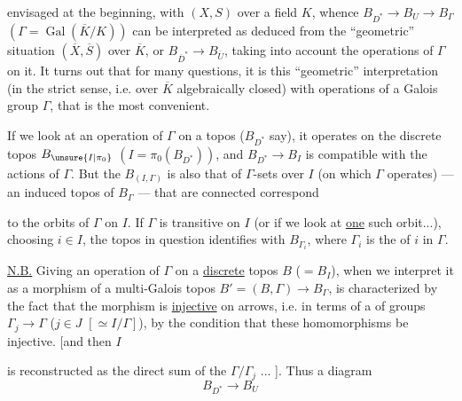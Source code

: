 
 envisaged at the beginning, with $(X,S)$ over a field $K$,
whence  $B_{D^*}\longrightarrow B_U\longrightarrow B_\Gamma$
$(\Gamma=\operatorname{Gal}(\overline K/K))$
can be interpreted as deduced
from the ``geometric'' situation $(\overline X,\overline S)$ over $\overline K$,
or $B_{\overline D^*}\longrightarrow B_{\overline U}$, taking into account
the operations of $\Gamma$ on it. It turns out
that for many questions, it is
this ``geometric'' interpretation (in the
strict sense, i.e. over $\overline K$ algebraically closed) with
operations of a Galois group $\Gamma$, that
is the most convenient.

If we look at an operation of $\Gamma$
on a topos ($B_{D^*}$ say),
it operates on the discrete topos $B_{\unsure{I|\pi_0}}$
$(I=\pi_0(B_{D^*}))$, and $B_{D^*}\longrightarrow B_I$ is
compatible with the actions of $\Gamma$. 
But the   $B_{(I,\Gamma)}$ is also
that of $\Gamma$-sets over
$I$ (on which $\Gamma$ operates) --- an induced topos
of $B_\Gamma$ ---  
that are connected correspond


to the orbits of $\Gamma$ on $I$. If $\Gamma$ is
transitive on $I$  (or if we look at \uline{one}
such orbit...), choosing $i\in I$, the topos
in question identifies with $B_{\Gamma_i}$, where $\Gamma_i$
is the  of  $i$ in $\Gamma$.

\uline{N.B.} Giving an operation of $\Gamma$
on a \uline{discrete} topos $B$ ($=B_I$),
when we interpret it as
a morphism of a
multi-Galois topos $B'=(B,\Gamma)\longrightarrow B_\Gamma$,
is characterized by the fact that
the morphism 
is \uline{injective} on
arrows, i.e. in terms of a 
 of groups $\Gamma_j\longrightarrow\Gamma$ ($j\in J$
$[\simeq I/\Gamma]$), by the condition that these
homomorphisms be injective. [and then $I$

is reconstructed as the direct
sum of the $\Gamma/\Gamma_j$ ... ]. Thus a
diagram
\[
 B_{D^*}\longrightarrow B_U
\]


